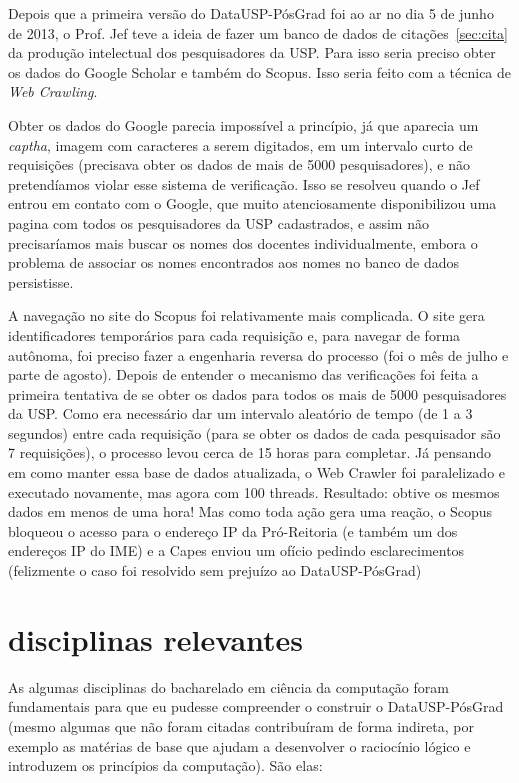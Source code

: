 \par Depois que a primeira versão do DataUSP-PósGrad foi ao ar no dia 5 de junho de 2013, o Prof. Jef teve a ideia de fazer um banco de dados de citações~\ref{sec:cita} da produção intelectual dos pesquisadores da USP. Para isso seria preciso obter os dados do Google Scholar e também do Scopus. Isso seria feito com a técnica de \emph{Web Crawling}. 

\par Obter os dados do Google parecia impossível a princípio, já que aparecia um \emph{captha}, imagem com caracteres a serem digitados, em um intervalo curto de requisições (precisava obter os dados de mais de 5000 pesquisadores), e não pretendíamos violar esse sistema de verificação. Isso se resolveu quando o Jef entrou em contato com o Google, que muito atenciosamente disponibilizou uma pagina com todos os pesquisadores da USP cadastrados, e assim não precisaríamos mais buscar os nomes dos docentes individualmente, embora o problema de associar os nomes encontrados aos nomes no banco de dados persistisse.

\par A navegação no site do Scopus foi relativamente mais complicada. O site gera identificadores temporários para cada requisição e, para navegar de forma autônoma, foi preciso fazer a engenharia reversa do processo (foi o mês de julho e parte de agosto). Depois de entender o mecanismo das verificações foi feita a primeira tentativa de se obter os dados para todos os mais de 5000 pesquisadores da USP. Como era necessário dar um intervalo aleatório de tempo (de 1 a 3 segundos) entre cada requisição (para se obter os dados de cada pesquisador são 7 requisições), o processo levou cerca de 15 horas para completar. Já pensando em como manter essa base de dados atualizada, o Web Crawler foi paralelizado e executado novamente, mas agora com 100 threads. Resultado: obtive os mesmos dados em menos de uma hora! Mas como toda ação gera uma reação, o Scopus bloqueou o acesso para o endereço IP da Pró-Reitoria (e também um dos endereços IP do IME) e a Capes enviou um ofício pedindo esclarecimentos (felizmente o caso foi resolvido sem prejuízo ao DataUSP-PósGrad)   

\section{disciplinas relevantes}

As algumas disciplinas do bacharelado em ciência da computação foram fundamentais para que eu pudesse
compreender o construir o DataUSP-PósGrad (mesmo algumas que não foram citadas contribuíram de forma indireta, por exemplo as matérias de base que ajudam a desenvolver o raciocínio lógico e introduzem os princípios da computação). São elas:

